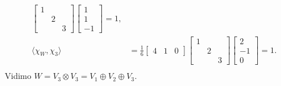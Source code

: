 \begin{zgled}
\begin{align*}
\begin{bmatrix}
			1 &   &   \\
			  & 2 &   \\
			  &   & 3
			\end{bmatrix} \begin{bmatrix} 1 \\ 1 \\ -1 \end{bmatrix} = 1, \\
		\langle \chi_W, \chi_3 \rangle &= \frac{1}{6}\begin{bmatrix} 4 & 1 & 0 \end{bmatrix} \begin{bmatrix}
			1 &   &   \\
			  & 2 &   \\
			  &   & 3
			\end{bmatrix} \begin{bmatrix} 2 \\ -1 \\ 0 \end{bmatrix} = 1. \\
	\end{align*}
	Vidimo $W = V_3 \otimes V_3 = V_1 \oplus V_2 \oplus V_3$.
\end{zgled}


